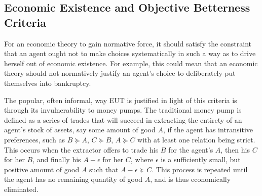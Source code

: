 \documentclass[../main.tex]{subfiles}
\begin{document}

\subsection{Economic Existence and Objective Betterness Criteria}

For an economic theory to gain normative force, it should satisfy the constraint that an agent ought not to make choices systematically in such a way as to drive herself out of economic existence.
For example, this could mean that an economic theory should not normatively justify an agent's choice to deliberately put themselves into bankruptcy.{\footnotemark}

\addtocounter{footnote}{-1}

The popular, often informal, way EUT is justified in light of this criteria is through its invulnerability to money pumps.
The traditional money pump is defined as a series of trades that will succeed in extracting the entirety of an agent's stock of assets, say some amount of good $A$, if the agent has intransitive preferences, such as $B \succcurlyeq A$, $C \succcurlyeq B$, $A \succcurlyeq C$ with at least one relation being strict.
This occurs when the extractor offers to trade his $B$ for the agent's $A$, then his $C$ for her $B$, and finally his $A - \epsilon$ for her $C$, where $\epsilon$ is a sufficiently small, but positive amount of good $A$ such that $A - \epsilon \succcurlyeq C$.
This process is repeated until the agent has no remaining quantity of good $A$, and is thus economically eliminated.
\end{document}
